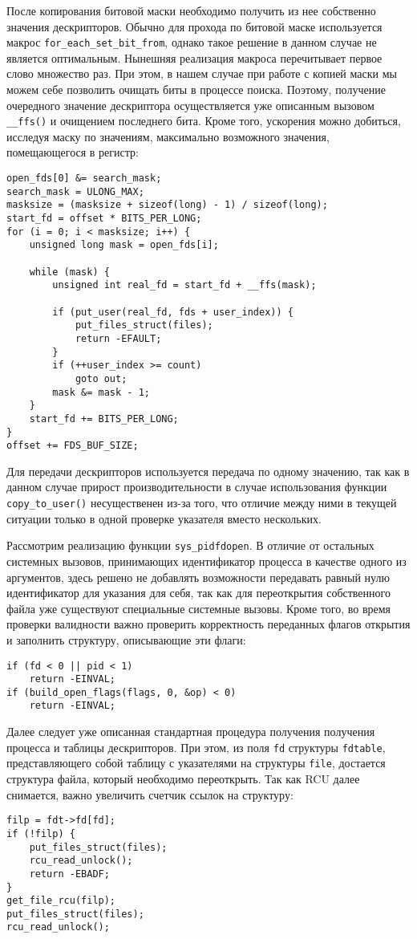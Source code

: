 После копирования битовой маски необходимо получить из нее собственно значения
дескрипторов. Обычно для прохода по битовой маске используется макрос
\texttt{for\_each\_set\_bit\_from}, однако такое решение в данном случае не
является оптимальным. Нынешняя реализация макроса перечитывает первое слово
множество раз. При этом, в нашем случае при работе с копией маски мы можем себе
позволить очищать биты в процессе поиска. Поэтому, получение очередного значение
дескриптора осуществляется уже описанным вызовом \texttt{\_\_ffs()} и очищением
последнего бита. Кроме того, ускорения можно добиться, исследуя маску по
значениям, максимально возможного значения, помещающегося в регистр:
\medskip
\begin{lstlisting}[style=cstyle]
open_fds[0] &= search_mask;
search_mask = ULONG_MAX;
masksize = (masksize + sizeof(long) - 1) / sizeof(long);
start_fd = offset * BITS_PER_LONG;
for (i = 0; i < masksize; i++) {
	unsigned long mask = open_fds[i];

	while (mask) {
		unsigned int real_fd = start_fd + __ffs(mask);

		if (put_user(real_fd, fds + user_index)) {
			put_files_struct(files);
			return -EFAULT;
		}
		if (++user_index >= count)
			goto out;
		mask &= mask - 1;
	}
	start_fd += BITS_PER_LONG;
}
offset += FDS_BUF_SIZE;
\end{lstlisting}
\medskip

Для передачи дескрипторов используется передача по одному значению, так как
в данном случае прирост производительности в случае использования функции
\texttt{copy\_to\_user()} несущественен из-за того, что отличие между ними в
текущей ситуации только в одной проверке указателя вместо нескольких.

Рассмотрим реализацию функции \texttt{sys\_pidfdopen}. В отличие от остальных
системных вызовов, принимающих идентификатор процесса в качестве одного из
аргументов, здесь решено не добавлять возможности передавать равный нулю
идентификатор для указания для себя, так как для переоткрытия собственного файла
уже существуют специальные системные вызовы. Кроме того, во время проверки
валидности важно проверить корректность переданных флагов открытия и заполнить
структуру, описывающие эти флаги:
\medskip
\begin{lstlisting}[style=cstyle]
if (fd < 0 || pid < 1)
	return -EINVAL;
if (build_open_flags(flags, 0, &op) < 0)
	return -EINVAL;
\end{lstlisting}
\medskip

Далее следует уже описанная стандартная процедура получения получения процесса и
таблицы дескрипторов. При этом, из поля \texttt{fd} структуры \texttt{fdtable},
представляющего собой таблицу с указателями на структуры \texttt{file},
достается структура файла, который необходимо переоткрыть. Так как RCU далее
снимается, важно увеличить счетчик ссылок на структуру:
\medskip
\begin{lstlisting}[style=cstyle]
filp = fdt->fd[fd];
if (!filp) {
	put_files_struct(files);
	rcu_read_unlock();
	return -EBADF;
}
get_file_rcu(filp);
put_files_struct(files);
rcu_read_unlock();
\end{lstlisting}
\medskip

